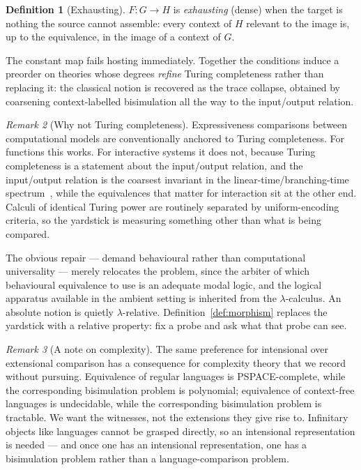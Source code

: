 \documentclass[11pt]{article}
\theoremstyle{definition}
\newtheorem{definition}{Definition}[section]
\theoremstyle{plain}
\theoremstyle{remark}
\newtheorem{remark}[definition]{Remark}
\begin{document}
\begin{definition}[Exhausting]
$F : G \to H$ is \emph{exhausting} (dense) when the target is nothing the source cannot
assemble: every context of $H$ relevant to the image is, up to the equivalence, in the
image of a context of $G$.
\end{definition}

The constant map fails hosting immediately. Together the conditions induce a preorder on
theories whose degrees \emph{refine} Turing completeness rather than replacing it: the
classical notion is recovered as the trace collapse, obtained by coarsening
context-labelled bisimulation all the way to the input/output relation.

\begin{remark}[Why not Turing completeness]
Expressiveness comparisons between computational models are conventionally anchored to
Turing completeness. For functions this works. For interactive systems it does not,
because Turing completeness is a statement about the input/output relation, and the
input/output relation is the coarsest invariant in the linear-time/branching-time
spectrum~\cite{vanGlabbeek1990}, while the equivalences that matter for interaction sit
at the other end. Calculi of identical Turing power are routinely separated by
uniform-encoding criteria, so the yardstick is measuring something other than what is
being compared.

The obvious repair --- demand behavioural rather than computational universality ---
merely relocates the problem, since the arbiter of which behavioural equivalence to use
is an adequate modal logic, and the logical apparatus available in the ambient setting is
inherited from the $\lambda$-calculus. An absolute notion is quietly $\lambda$-relative.
Definition~\ref{def:morphism} replaces the yardstick with a relative property: fix a
probe and ask what that probe can see.
\end{remark}

\begin{remark}[A note on complexity]
The same preference for intensional over extensional comparison has a consequence for
complexity theory that we record without pursuing. Equivalence of regular languages is
\textsc{PSPACE}-complete, while the corresponding bisimulation problem is polynomial;
equivalence of context-free languages is undecidable, while the corresponding
bisimulation problem is tractable. We want the witnesses, not the extensions they give
rise to. Infinitary objects like languages cannot be grasped directly, so an intensional
representation is needed --- and once one has an intensional representation, one has a
bisimulation problem rather than a language-comparison problem.
\end{remark}
\end{document}
